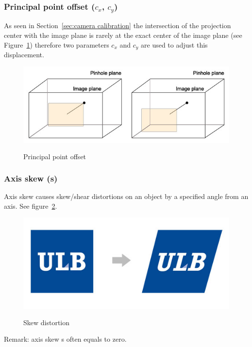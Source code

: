 \subsubsection{Principal point offset ($c_x$, $c_y$)}
As seen in Section~\ref{sec:camera calibration} the intersection of the projection center with the image plane is rarely at the exact center of the image plane (see Figure~\ref{fig:principalpoint}) therefore two parameters $c_x$ and $c_y$ are used to adjust this displacement.\\

\begin{figure}
\caption{Principal point offset}
\centering
    \includegraphics[width=1.0\textwidth]{images/principalpoint.jpg}
\label{fig:principalpoint}
\end{figure}


\subsubsection{Axis skew (s)}
Axis skew causes skew/shear distortions on an object by a specified angle from an axis. See figure~\ref{fig:ulbskew}.


\begin{figure}
\caption{Skew distortion}
\centering
    \includegraphics[width=1.0\textwidth]{images/ulbskew.jpg}
\label{fig:ulbskew}
\end{figure}

Remark: axis skew s often equals to zero.

